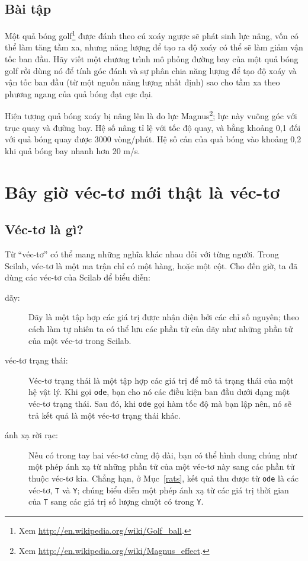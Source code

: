 \documentclass[12pt]{book}
\begin{document}
\section{Bài tập}

\begin{ex}
\label{golf}

Một quả bóng golf\footnote{Xem
\url{http://en.wikipedia.org/wiki/Golf_ball}.} được đánh theo cú xoáy ngược 
sẽ phát sinh lực nâng, vốn có thể làm tăng tầm xa, nhưng năng lượng để 
tạo ra độ xoáy có thể sẽ làm giảm vận tốc ban đầu. Hãy viết một chương trình 
mô phỏng đường bay của một quả bóng golf rồi dùng nó để tính góc đánh 
và sự phân chia năng lượng để tạo độ xoáy và vận tốc ban đầu (từ một 
nguồn năng lượng nhất định) sao cho tầm xa theo phương ngang của quả 
bóng đạt cực đại.

Hiện tượng quả bóng xoáy bị nâng lên là do lực Magnus\footnote{Xem 
\url{http://en.wikipedia.org/wiki/Magnus_effect}.}; lực này vuông góc với 
trục quay và đường bay. Hệ số nâng tỉ lệ với tốc độ quay, và bằng khoảng 
0,1 đối với quả bóng quay được 3000 vòng/phút. Hệ số cản của quả bóng 
vào khoảng 0,2 khi quả bóng bay nhanh hơn 20 m/s.
\end{ex}



\chapter{Bây giờ véc-tơ mới thật là véc-tơ}

\section{Véc-tơ là gì?}

Từ ``véc-tơ'' có thể mang những nghĩa khác nhau đối với từng người. Trong 
Scilab, véc-tơ là một ma trận chỉ có một hàng, hoặc một cột. Cho đến giờ,
ta đã dùng các véc-tơ của Scilab để biểu diễn:

\begin{description}

\item[dãy:] Dãy là một tập hợp các giá trị được nhận diện bởi các chỉ số 
nguyên; theo cách làm tự nhiên ta có thể lưu các phần tử của dãy như những 
phần tử của một véc-tơ trong Scilab.

\item[véc-tơ trạng thái:] Véc-tơ trạng thái là một tập hợp các giá trị để mô tả 
trạng thái của một hệ vật lý. Khi gọi {\tt ode}, bạn cho nó các điều kiện 
ban đầu dưới dạng một véc-tơ trạng thái. Sau đó, khi {\tt ode} gọi hàm 
tốc độ mà bạn lập nên, nó sẽ trả kết quả là một véc-tơ trạng thái khác.

\item[ánh xạ rời rạc:] Nếu có trong tay hai véc-tơ cùng độ dài, bạn có thể hình 
dung chúng như một phép ánh xạ từ những phần tử của một véc-tơ này sang 
các phần tử thuộc véc-tơ kia. Chẳng hạn, ở Mục~\ref{rats}, kết quả thu được 
từ  {\tt ode} là các véc-tơ, {\tt T} và {\tt Y}; chúng biểu diễn một phép 
ánh xạ từ các giá trị thời gian của {\tt T} sang các giá trị số lượng chuột có 
trong {\tt Y}.

\end{description}
\end{document}
